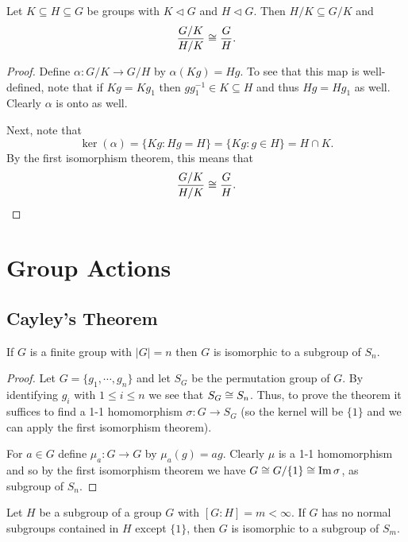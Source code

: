 \documentclass[11pt]{article}
\begin{document}
\begin{theorem}
    Let $K\subseteq H\subseteq G$ be groups with $K\lhd G$ and $H\lhd G$. Then $H/K\subseteq G/K$ and
    \[\frac{G/K}{H/K}\cong\frac{G}{H}.\]
\end{theorem}

\begin{proof}
    Define $\alpha:G/K\to G/H$ by $\alpha(Kg)=Hg$. To see that this map is well-defined, note that if $Kg=Kg_1$ then $gg_1^{-1}\in K\subseteq H$ and thus $Hg=Hg_1$ as well. Clearly $\alpha$ is onto as well.

    Next, note that
    \[\ker(\alpha)=\{Kg:Hg=H\}=\{Kg:g\in H\}=H\cap K.\]
    By the first isomorphism theorem, this means that
    \[\frac{G/K}{H/K}\cong\frac{G}{H}.\]
\end{proof}

\section{Group Actions}

\subsection{Cayley's Theorem}

\begin{theorem}
    If $G$ is a finite group with $|G|=n$ then $G$ is isomorphic to a subgroup of $S_n$.
\end{theorem}

\begin{proof}
    Let $G=\{g_1,\cdots, g_n\}$ and let $S_G$ be the permutation group of $G$. By identifying $g_i$ with $1\leq i\leq n$ we see that $S_G\cong S_n$. Thus, to prove the theorem it suffices to find a 1-1 homomorphism $\sigma:G\to S_G$ (so the kernel will be $\{1\}$ and we can apply the first isomorphism theorem).

    For $a\in G$ define $\mu_a:G\to G$ by $\mu_a(g)=ag$. Clearly $\mu$ is a 1-1 homomorphism and so by the first isomorphism theorem we have $G\cong G/\{1\}\cong\operatorname{Im}\sigma$, as subgroup of $S_n$.
\end{proof}

\begin{theorem}
    Let $H$ be a subgroup of a group $G$ with $[G:H]=m<\infty$. If $G$ has no normal subgroups contained in $H$ except $\{1\}$, then $G$ is isomorphic to a subgroup of $S_m$.
\end{theorem}
\end{document}
